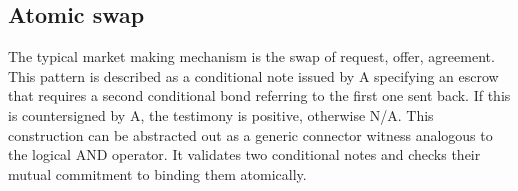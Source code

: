 \subsection{Atomic swap}

The typical market making mechanism is the swap of request, offer, agreement. This pattern is described as a conditional note issued by A specifying an escrow that requires a second conditional bond referring to the first one sent back.  
If this is countersigned by A, the testimony is positive, otherwise N/A.
This construction can be abstracted out as a generic connector witness analogous to the logical AND operator. It validates two conditional notes and checks their mutual commitment to binding them atomically. 

